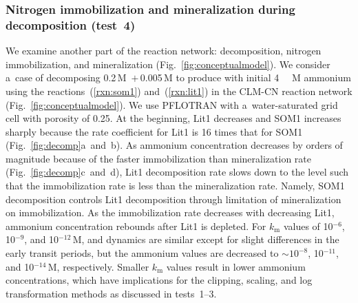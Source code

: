 \documentclass[gmd,noline]{copernicus}
\begin{document}
\subsubsection{Nitrogen immobilization and mineralization during decomposition (test~4)}%



      We examine another part of the reaction network: decomposition,
      nitrogen immobilization, and mineralization
      (Fig.~\ref{fig:conceptualmodel}). We consider a~case of decomposing
      0.2\,\unit{M} \,$+$\,0.005\,\unit{M}  to
      produce  with initial 4\,\unit{{\mu}\,M} ammonium using the
      reactions~(\ref{rxn:som1}) and~(\ref{rxn:lit1}) in the CLM-CN reaction
      network (Fig.~\ref{fig:conceptualmodel}). We use PFLOTRAN with
      a~water-saturated grid cell with porosity of 0.25. At the beginning,
      Lit1 decreases and SOM1 increases sharply because the rate coefficient
      for Lit1 is 16 times that for SOM1 (Fig.~\ref{fig:decomp}a~and~b). As
      ammonium concentration decreases by orders of magnitude because of the
      faster immobilization than mineralization rate
      (Fig.~\ref{fig:decomp}c~and~d), Lit1 decomposition rate slows down to
      the level such that the immobilization rate is less than the
      mineralization rate. Namely, SOM1 decomposition controls Lit1
      decomposition through limitation of mineralization on
      immobilization. As the immobilization rate decreases with decreasing
      Lit1, ammonium concentration rebounds after Lit1 is depleted. For
      $k_\mathrm{m}$ values of 10$^{-6}$, 10$^{-9}$, and 10$^{-12}$\,M,
       and  dynamics are similar except for slight
      differences in the early transit periods, but the ammonium values are
      decreased to $\sim 1 0^{-8}$, 10$^{-11}$, and 10$^{-14}$\,M,
      respectively. Smaller $k_\mathrm{m}$ values result in lower ammonium
      concentrations, which have implications for the clipping, scaling, and
      log transformation methods as discussed in tests~1--3.
\end{document}

